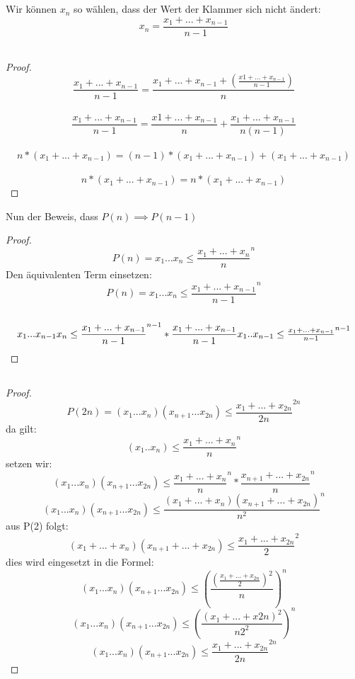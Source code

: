 \documentclass[10pt,ngerman]{article}
\begin{document}
	\subsection{}
	Wir können $x_n$ so wählen, dass der Wert der Klammer sich nicht ändert:
	$$x_n=\frac{x_1+...+x_{n-1}}{n-1}$$\\
	\begin{proof}
	$$\frac{x_1+...+x_{n-1}}{n-1}=\frac{x_1+...+x_{n-1}+(\frac{x1+...+x_{n-1}}{n-1})}{n}$$\\
	$$\frac{x_1+...+x_{n-1}}{n-1}=\frac{x1+...+x_{n-1}}{n}+\frac{x_1+...+x_{n-1}}{n(n-1)}$$\\
	$$n*(x_1+...+x_{n-1})=(n-1)*(x_1+...+x_{n-1})+(x_1+...+x_{n-1})$$\\
	$$n*(x_1+...+x_{n-1})=n*(x_1+...+x_{n-1})$$
	\end{proof}
	Nun der Beweis, dass \(P(n)\implies P(n-1)\)\\
	\begin{proof}
	\[P(n)=x_1...x_n \leq \frac{x_1+...+x_n}{n}^n\]
	Den äquivalenten Term einsetzen:\\
	\[P(n)=x_1...x_n \leq\frac{x_1+...+x_{n-1}}{n-1}^n\]\\
	\[x_1...x_{n-1}x_n \leq \frac{x_1+...+x_{n-1}}{n-1}^{n-1}*\frac{x_1+...+x_{n-1}}{n-1}$$\\
	$$x_1..x_{n-1} \leq \frac{x_1+...+x_{n-1}}{n-1}^{n-1}\] 
	\end{proof}
	\subsection{}
	\begin{proof}
		\[P(2n)=(x_1...x_n)(x_{n+1}...x_{2n}) \leq \frac{x_1+...+x_{2n}}{2n}^{2n}\]
		da gilt: \[(x_1..x_n) \leq \frac{x_1+...+x_n}{n}^n\]
		setzen wir: \[(x_1...x_n)(x_{n+1}...x_{2n}) \leq \frac{x_1+...+x_n}{n}^n * \frac{x_{n+1}+...+x_{2n}}{n}^n\]
		\[(x_1...x_n)(x_{n+1}...x_{2n}) \leq \frac{(x_1+...+x_n)(x_{n+1}+...+x_{2n})}{n^2}^n\]
		aus P(2) folgt: \[(x_1+...+x_n)(x_{n+1}+...+x_{2n}) \leq \frac{x_1+...+x_{2n}}{2}^2 \]
		dies wird eingesetzt in die Formel: \[(x_1...x_n)(x_{n+1}...x_{2n}) \leq(\dfrac{(\frac{x_1+...+x_{2n}}{2})^2}{n})^n \]
		\[(x_1...x_n)(x_{n+1}...x_{2n}) \leq(\dfrac{(x_1+...+x{2n})^2}{n2^2})^n \]
		\[(x_1...x_n)(x_{n+1}...x_{2n}) \leq \dfrac{x_1+...+x_{2n}}{2n}^{2n} \]
		
	\end{proof}
\end{document}
